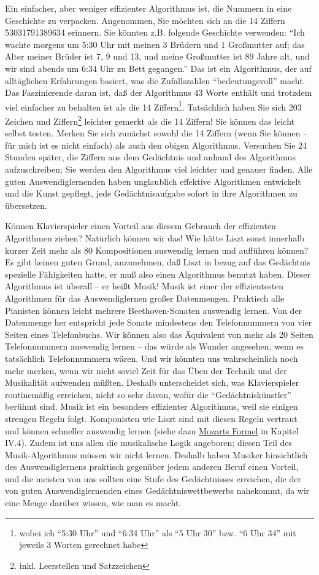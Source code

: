 Ein einfacher, aber weniger effizienter Algorithmus ist, die Nummern in eine Geschichte zu verpacken.
Angenommen, Sie möchten sich an die 14 Ziffern 53031791389634 erinnern.
Sie könnten z.B. folgende Geschichte verwenden: \enquote{Ich wachte morgens um 5:30 Uhr mit meinen 3 Brüdern und 1 Großmutter auf; das Alter meiner Brüder ist 7, 9 und 13, und meine Großmutter ist 89 Jahre alt, und wir sind abends um 6:34 Uhr zu Bett gegangen.}
Das ist ein Algorithmus, der auf alltäglichen Erfahrungen basiert, was die Zufallszahlen \enquote{bedeutungsvoll} macht.
Das Faszinierende daran ist, daß der Algorithmus 43 Worte enthält und trotzdem viel einfacher zu behalten ist als die 14 Ziffern\footnote{wobei ich \enquote{5:30 Uhr} und \enquote{6:34 Uhr} als \enquote{5 Uhr 30} bzw. \enquote{6 Uhr 34} mit jeweils 3 Worten gerechnet habe}.
Tatsächlich haben Sie sich 203 Zeichen und Ziffern\footnote{inkl. Leerstellen und Satzzeichen} leichter gemerkt als die 14 Ziffern!
Sie können das leicht selbst testen.
Merken Sie sich zunächst sowohl die 14 Ziffern (wenn Sie können -- für mich ist es nicht einfach) als auch den obigen Algorithmus.
Versuchen Sie 24 Stunden später, die Ziffern aus dem Gedächtnis und anhand des Algorithmus aufzuschreiben; Sie werden den Algorithmus viel leichter und genauer finden.
Alle guten Auswendiglernenden haben unglaublich effektive Algorithmen entwickelt und die Kunst gepflegt, jede Gedächtnisaufgabe sofort in ihre Algorithmen zu übersetzen.

Können Klavierspieler einen Vorteil aus diesem Gebrauch der effizienten Algorithmen ziehen?
Natürlich können wir das!
Wie hätte Liszt sonst innerhalb kurzer Zeit mehr als 80 Kompositionen auswendig lernen und aufführen können?
Es gibt keinen guten Grund, anzunehmen, daß Liszt in bezug auf das Gedächtnis spezielle Fähigkeiten hatte, er muß also einen Algorithmus benutzt haben.
Dieser Algorithmus ist überall -- er heißt Musik!
Musik ist einer der effizientesten Algorithmen für das Auswendiglernen großer Datenmengen.
Praktisch alle Pianisten können leicht mehrere Beethoven-Sonaten auswendig lernen.
Von der Datenmenge her entspricht jede Sonate mindestens den Telefonnummern von vier Seiten eines Telefonbuchs.
Wir können also das Äquivalent von mehr als 20 Seiten Telefonnummern auswendig lernen -- das würde als Wunder angesehen, wenn es tatsächlich Telefonnummern wären.
Und wir könnten uns wahrscheinlich noch mehr merken, wenn wir nicht soviel Zeit für das Üben der Technik und der Musikalität aufwenden müßten.
Deshalb unterscheidet sich, was Klavierspieler routinemäßig erreichen, nicht so sehr davon, wofür die \enquote{Gedächtniskünstler} berühmt sind.
Musik ist ein besonders effizienter Algorithmus, weil sie einigen strengen Regeln folgt.
Komponisten wie Liszt sind mit diesen Regeln vertraut und können schneller auswendig lernen (siehe dazu \hyperref[c1iv4]{Mozarts Formel} in Kapitel IV.4).
Zudem ist uns allen die musikalische Logik angeboren; diesen Teil des Musik-Algorithmus müssen wir nicht lernen.
Deshalb haben Musiker hinsichtlich des Auswendiglernens praktisch gegenüber jedem anderen Beruf einen Vorteil, und die meisten von uns sollten eine Stufe des Gedächtnisses erreichen, die der von guten Auswendiglernenden eines Gedächtniswettbewerbs nahekommt, da wir eine Menge darüber wissen, wie man es macht.


